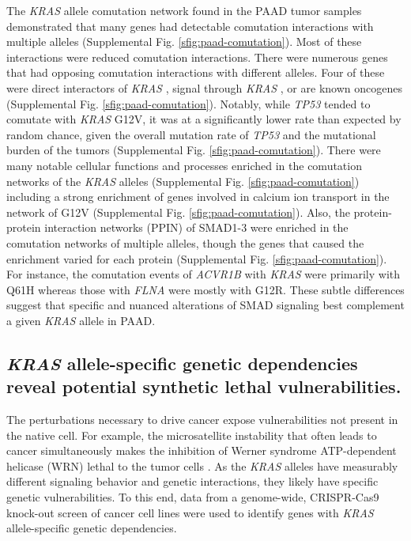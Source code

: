 \documentclass[english, 10pt, letterpaper]{article}
\newcommand{\KRAS}{\emph{KRAS}}
\begin{document}
The \KRAS{} allele comutation network found in the PAAD tumor samples demonstrated that many genes had detectable comutation interactions with multiple alleles (Supplemental Fig. \ref{sfig:paad-comutation}).
Most of these interactions were reduced comutation interactions.
There were numerous genes that had opposing comutation interactions with different alleles.
Four of these were direct interactors of \KRAS{} \cite{Kovalski2019}, signal through \KRAS{} \cite{Kanehisa2017, Kanehisa2016KEGGAnnotation.}, or are known oncogenes \cite{Bamford2004TheWebsite., Sondka2018} (Supplemental Fig. \ref{sfig:paad-comutation}).
Notably, while \emph{TP53} tended to comutate with \KRAS{} G12V, it was at a significantly lower rate than expected by random chance, given the overall mutation rate of \emph{TP53} and the mutational burden of the tumors (Supplemental Fig. \ref{sfig:paad-comutation}).
There were many notable cellular functions and processes enriched in the comutation networks of the \KRAS{} alleles (Supplemental Fig. \ref{sfig:paad-comutation}) including a strong enrichment of genes involved in calcium ion transport in the network of G12V (Supplemental Fig. \ref{sfig:paad-comutation}).
Also, the protein-protein interaction networks (PPIN) of SMAD1-3 were enriched in the comutation networks of multiple alleles, though the genes that caused the enrichment varied for each protein (Supplemental Fig. \ref{sfig:paad-comutation}).
For instance, the comutation events of \emph{ACVR1B} with \KRAS{} were primarily with Q61H whereas those with \emph{FLNA} were mostly with G12R.
These subtle differences suggest that specific and nuanced alterations of SMAD signaling best complement a given \KRAS{} allele in PAAD.


\subsection*{\KRAS{} allele-specific genetic dependencies reveal potential synthetic lethal vulnerabilities.}

The perturbations necessary to drive cancer expose vulnerabilities not present in the native cell.
For example, the microsatellite instability that often leads to cancer simultaneously makes the inhibition of Werner syndrome ATP-dependent helicase (WRN) lethal to the tumor cells \cite{Behan2019, Chan2019}.
As the \KRAS{} alleles have measurably different signaling behavior and genetic interactions, they likely have specific genetic vulnerabilities.
To this end, data from a genome-wide, CRISPR-Cas9 knock-out screen of cancer cell lines \cite{Tsherniak2017, Meyers2017} were used to identify genes with \KRAS{} allele-specific genetic dependencies.
\end{document}
